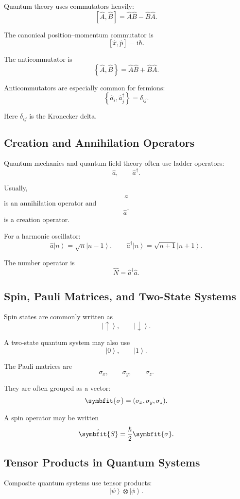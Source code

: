 \documentclass[11pt,twocolumn]{article}
\newcommand{\vct}[1]{\symbfit{#1}}   %
\newcommand{\ii}{\mathrm{i}}
\newcommand{\ket}[1]{\left|#1\right\rangle}
\newcommand{\qop}[1]{\hat{#1}}
\newcommand{\commutator}[2]{\left[#1,#2\right]}
\newcommand{\anticommutator}[2]{\left\{#1,#2\right\}}
\begin{document}
Quantum theory uses commutators heavily:
\[
\commutator{\qop{A}}{\qop{B}}
=
\qop{A}\qop{B}
-
\qop{B}\qop{A}.
\]

The canonical position--momentum commutator is
\[
\commutator{\qop{x}}{\qop{p}}
=
\ii\hbar.
\]

The anticommutator is
\[
\anticommutator{\qop{A}}{\qop{B}}
=
\qop{A}\qop{B}
+
\qop{B}\qop{A}.
\]

Anticommutators are especially common for fermions:
\[
\anticommutator{\qop{a}_i}{\qop{a}_j^\dagger}
=
\delta_{ij}.
\]

Here \(\delta_{ij}\) is the Kronecker delta.

\subsection{Creation and Annihilation Operators}

Quantum mechanics and quantum field theory often use ladder operators:
\[
\qop{a},
\qquad
\qop{a}^{\dagger}.
\]

Usually,
\[
\qop{a}
\]
is an annihilation operator and
\[
\qop{a}^{\dagger}
\]
is a creation operator.

For a harmonic oscillator:
\[
\qop{a}\ket{n}
=
\sqrt{n}\ket{n-1},
\qquad
\qop{a}^{\dagger}\ket{n}
=
\sqrt{n+1}\ket{n+1}.
\]

The number operator is
\[
\qop{N}
=
\qop{a}^{\dagger}\qop{a}.
\]

\subsection{Spin, Pauli Matrices, and Two-State Systems}

Spin states are commonly written as
\[
\ket{\uparrow},
\qquad
\ket{\downarrow}.
\]

A two-state quantum system may also use
\[
\ket{0},
\qquad
\ket{1}.
\]

The Pauli matrices are
\[
\sigma_x,
\qquad
\sigma_y,
\qquad
\sigma_z.
\]

They are often grouped as a vector:
\[
\vct{\sigma}
=
(\sigma_x,\sigma_y,\sigma_z).
\]

A spin operator may be written
\[
\qop{\vct{S}}
=
\frac{\hbar}{2}\vct{\sigma}.
\]

\subsection{Tensor Products in Quantum Systems}

Composite quantum systems use tensor products:
\[
\ket{\psi}\otimes\ket{\phi}.
\]
\end{document}
